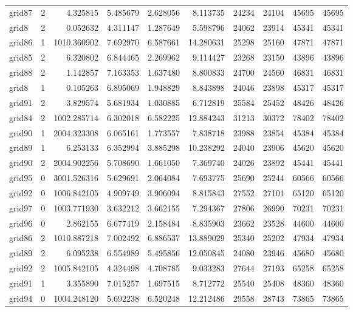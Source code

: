 \begin{longtable}{|l|r|r|r|r|r|r|r|r|r|}
grid87 & 2 & 4.325815 & 5.485679 & 2.628056 & 8.113735 & 24234 & 24104 & 45695 & 45695 \\
grid8 & 2 & 0.052632 & 4.311147 & 1.287649 & 5.598796 & 24062 & 23914 & 45341 & 45341 \\
grid86 & 1 & 1010.360902 & 7.692970 & 6.587661 & 14.280631 & 25298 & 25160 & 47871 & 47871 \\
grid85 & 2 & 6.320802 & 6.844465 & 2.269962 & 9.114427 & 23268 & 23150 & 43896 & 43896 \\
grid88 & 2 & 1.142857 & 7.163353 & 1.637480 & 8.800833 & 24700 & 24560 & 46831 & 46831 \\
grid8 & 1 & 0.105263 & 6.895069 & 1.948829 & 8.843898 & 24046 & 23898 & 45317 & 45317 \\
grid91 & 2 & 3.829574 & 5.681934 & 1.030885 & 6.712819 & 25584 & 25452 & 48426 & 48426 \\
grid84 & 2 & 1002.285714 & 6.302018 & 6.582225 & 12.884243 & 31213 & 30372 & 78402 & 78402 \\
grid90 & 1 & 2004.323308 & 6.065161 & 1.773557 & 7.838718 & 23988 & 23854 & 45384 & 45384 \\
grid89 & 1 & 6.253133 & 6.352994 & 3.885298 & 10.238292 & 24040 & 23906 & 45620 & 45620 \\
grid90 & 2 & 2004.902256 & 5.708690 & 1.661050 & 7.369740 & 24026 & 23892 & 45441 & 45441 \\
grid95 & 0 & 3001.526316 & 5.629691 & 2.064084 & 7.693775 & 25690 & 25244 & 60566 & 60566 \\
grid92 & 0 & 1006.842105 & 4.909749 & 3.906094 & 8.815843 & 27552 & 27101 & 65120 & 65120 \\
grid97 & 0 & 1003.771930 & 3.632212 & 3.662155 & 7.294367 & 27806 & 26990 & 70231 & 70231 \\
grid96 & 0 & 2.862155 & 6.677419 & 2.158484 & 8.835903 & 23662 & 23528 & 44600 & 44600 \\
grid86 & 2 & 1010.887218 & 7.002492 & 6.886537 & 13.889029 & 25340 & 25202 & 47934 & 47934 \\
grid89 & 2 & 6.095238 & 6.554989 & 5.495856 & 12.050845 & 24080 & 23946 & 45680 & 45680 \\
grid92 & 2 & 1005.842105 & 4.324498 & 4.708785 & 9.033283 & 27644 & 27193 & 65258 & 65258 \\
grid91 & 1 & 3.355890 & 7.015257 & 1.697515 & 8.712772 & 25540 & 25408 & 48360 & 48360 \\
grid94 & 0 & 1004.248120 & 5.692238 & 6.520248 & 12.212486 & 29558 & 28743 & 73865 & 73865 \\

\end{longtable}
